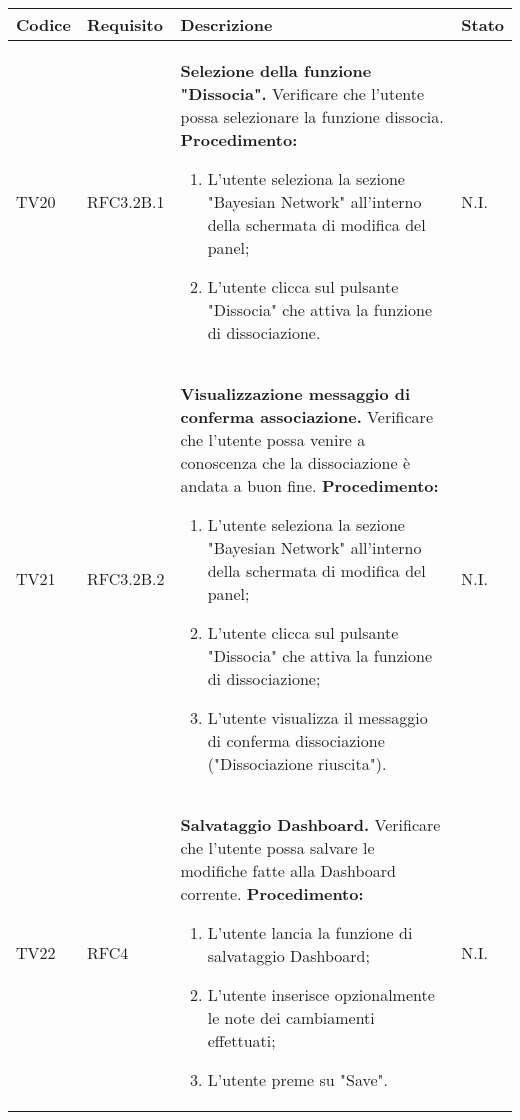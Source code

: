 \begin{table}[!htpb]
	\centering
	\renewcommand{\arraystretch}{2} 
	\begin{tabular}{|l|l|p{10cm}|l|}
		\rowcolor{orange!50}
		\hline
		\textbf{Codice} & \textbf{Requisito}& \textbf{Descrizione} & \textbf{Stato}\\ 
		\hline
		TV20 & RFC3.2B.1 &
			\textbf{Selezione della funzione "Dissocia".}
			\newline
			Verificare che l'utente possa selezionare la funzione dissocia.
			\newline
			\textbf{Procedimento:}
			\begin{enumerate}
			    \item L’utente seleziona la sezione "Bayesian Network" all'interno della schermata di modifica del panel;
				\item L’utente clicca sul pulsante "Dissocia" che attiva la funzione di dissociazione.
			\end{enumerate} 
			& N.I.\\
		\hline
		TV21 & RFC3.2B.2 &
			\textbf{Visualizzazione messaggio di conferma associazione.}
			\newline
			Verificare che l'utente possa venire a conoscenza che la dissociazione è andata a buon fine.
			\newline
			\textbf{Procedimento:}
			\begin{enumerate}
			    \item L’utente seleziona la sezione "Bayesian Network" all'interno della schermata di modifica del panel;
				\item L’utente clicca sul pulsante "Dissocia" che attiva la funzione di dissociazione;
				\item L’utente visualizza il messaggio di conferma dissociazione ("Dissociazione riuscita").
			\end{enumerate} 
			& N.I.\\
		\hline
		TV22 & RFC4 &
			\textbf{Salvataggio Dashboard.} 
			\newline
			Verificare che l’utente possa salvare le modifiche fatte alla Dashboard corrente. 
			\newline 
			\textbf{Procedimento:} 
			\begin{enumerate} 
				\item L'utente lancia la funzione di salvataggio Dashboard; 
				\item L'utente inserisce opzionalmente le note dei cambiamenti effettuati; 
				\item L'utente preme su "Save".		
			\end{enumerate} 
			& N.I.\\
		\hline
	\end{tabular}
\end{table}
